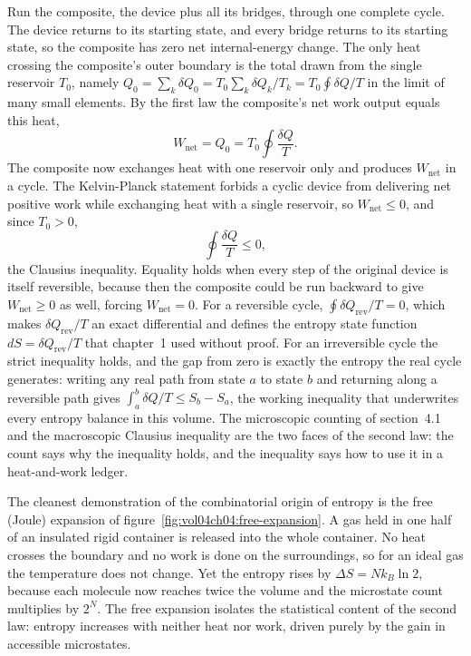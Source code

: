 Run the composite, the device plus all its bridges, through one
complete cycle. The device returns to its starting state, and every
bridge returns to its starting state, so the composite has zero net
internal-energy change. The only heat crossing the composite's outer
boundary is the total drawn from the single reservoir $T_0$, namely
$Q_0 = \sum_k \delta Q_0 = T_0 \sum_k \delta Q_k/T_k = T_0 \oint
\delta Q/T$ in the limit of many small elements. By the first law the
composite's net work output equals this heat,
\[
W_{\text{net}} = Q_0 = T_0 \oint \frac{\delta Q}{T}.
\]
The composite now exchanges heat with one reservoir only and produces
$W_{\text{net}}$ in a cycle. The Kelvin-Planck statement forbids a
cyclic device from delivering net positive work while exchanging heat
with a single reservoir, so $W_{\text{net}} \le 0$, and since $T_0 >
0$,
\[
\oint \frac{\delta Q}{T} \le 0,
\]
the Clausius inequality. Equality holds when every step of the
original device is itself reversible, because then the composite could
be run backward to give $W_{\text{net}} \ge 0$ as well, forcing
$W_{\text{net}} = 0$. For a reversible cycle, $\oint \delta Q_{\text{rev}}/T = 0$,
which makes $\delta Q_{\text{rev}}/T$ an exact differential and defines
the entropy state function $dS = \delta Q_{\text{rev}}/T$ that
chapter~1 used without proof. For an irreversible cycle the strict
inequality holds, and the gap from zero is exactly the entropy the
real cycle generates: writing any real path from state $a$ to state
$b$ and returning along a reversible path gives $\int_a^b \delta Q/T
\le S_b - S_a$, the working inequality that underwrites every entropy
balance in this volume. The microscopic counting of section~4.1 and
the macroscopic Clausius inequality are the two faces of the second
law: the count says why the inequality holds, and the inequality says
how to use it in a heat-and-work ledger.



The cleanest demonstration of the combinatorial origin of entropy is
the free (Joule) expansion of figure~\ref{fig:vol04ch04:free-expansion}.
A gas held in one half of an insulated rigid container is released into
the whole container. No heat crosses the boundary and no work is done
on the surroundings, so for an ideal gas the temperature does not
change. Yet the entropy rises by $\Delta S = N k_B \ln 2$, because each
molecule now reaches twice the volume and the microstate count
multiplies by $2^N$. The free expansion isolates the statistical
content of the second law: entropy increases with neither heat nor work,
driven purely by the gain in accessible microstates.

